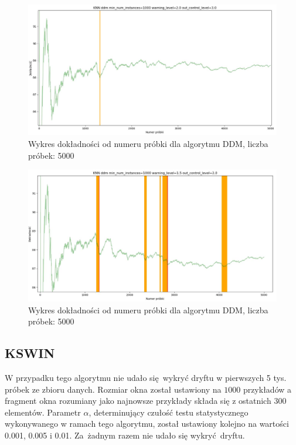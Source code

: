 \documentclass{classrep}
\begin{document}
{{            \begin{figure}[!htbp]
                \centering
                \includegraphics[width=\textwidth]{img/ddm.jpg}
                \caption
                {Wykres dokładności od numeru próbki dla algorytmu DDM, liczba próbek: 5000}
                \label{fig:ddm}
            \end{figure}
            \begin{figure}[!htbp]
                \centering
                \includegraphics[width=\textwidth]{img/ddm_too_sensitive.jpg}
                \caption
                {Wykres dokładności od numeru próbki dla algorytmu DDM, liczba próbek: 5000}
                \label{fig:ddm_too_sensitive}
            \end{figure}
            \FloatBarrier
        }

        \subsection{KSWIN} {
            W przypadku tego algorytmu nie udało się wykryć dryftu w pierwszych 5 tys. próbek ze
            zbioru danych. Rozmiar okna został ustawiony na $1000$ przykładów a fragment okna
            rozumiany jako najnowsze przykłady składa się z ostatnich $300$ elementów. Parametr
            $\alpha$, determinujący czułość testu statystycznego wykonywanego w ramach tego
            algorytmu, został ustawiony kolejno na wartości 0.001, 0.005 i 0.01. Za żadnym razem nie
            udało się wykryć dryftu.
        }

}
\end{document}
